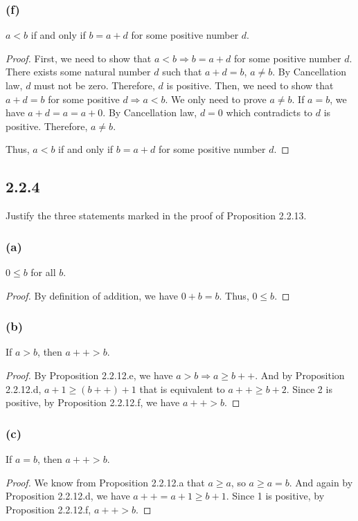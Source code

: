 \documentclass[12pt, letter]{article}
\begin{document}
\subsubsection*{(f)}
$a<b$ if and only if $b=a+d$ for some positive number $d$.
\begin{proof}
    First, we need to show that $a<b\Rightarrow b=a+d$ for some positive number $d$. There exists some natural number $d$ such that
    $a+d=b$, $a\ne b$. By Cancellation law, $d$ must not be zero. Therefore, $d$ is positive. Then, we need to show that $a+d=b$ for some positive $d\Rightarrow a<b$. We only need to prove $a\ne b$.
    If $a=b$, we have $a+d=a=a+0$. By Cancellation law, $d=0$ which contradicts to $d$ is positive. Therefore, $a\ne b$.
    
    Thus, $a<b$ if and only if $b=a+d$ for some positive number $d$.
\end{proof}
\subsection*{2.2.4}
Justify the three statements marked in the proof of Proposition 2.2.13. 
\subsubsection*{(a)}
$0\leq b$ for all $b$.
\begin{proof}
    By definition of addition, we have $0+b=b$. Thus, $0\leq b$.
\end{proof}
\subsubsection*{(b)}
If $a>b$, then $a++>b$.
\begin{proof}
    By Proposition 2.2.12.e, we have $a>b\Rightarrow a\geq b++$. And by Proposition 2.2.12.d, $a+1\geq (b++)+1$ that is equivalent to 
    $a++\geq b+2$. Since 2 is positive, by Proposition 2.2.12.f, we have $a++>b$. 
\end{proof}
\subsubsection*{(c)}
If $a=b$, then $a++>b$.
\begin{proof}
    We know from Proposition 2.2.12.a that $a\geq a$, so $a\geq a=b$. And again by Proposition 2.2.12.d, we have $a++=a+1\geq b+1$. Since 1 is positive, 
    by Proposition 2.2.12.f, $a++>b$.

\end{proof}
\end{document}
